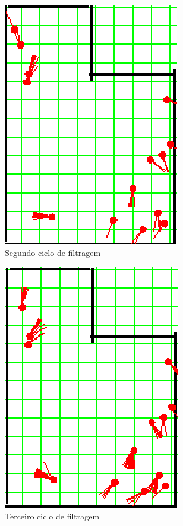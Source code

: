 \begin{figure}[H]
  \centering
  \includegraphics[scale=1]{figuras/cen4_ex3/3.eps}
  \caption[Segundo Ciclo de Filtragem]{Segundo ciclo de filtragem}
  \label{img:cen4_ex3_3}
\end{figure}

\begin{figure}[H]
  \centering
  \includegraphics[scale=1]{figuras/cen4_ex3/4.eps}
  \caption[Terceiro Ciclo de Filtragem]{Terceiro ciclo de filtragem}
  \label{img:cen4_ex3_4}
\end{figure}


